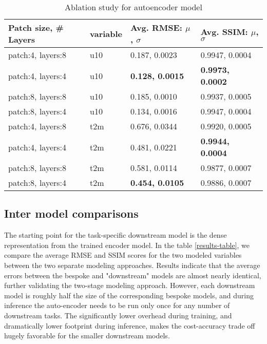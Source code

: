 \documentclass{article}
\begin{document}
\begin{table}[ht]
  \caption{Ablation study for autoencoder model} 
  \label{autoencresults-table}
  \centering
  \begin{tabular}{llll}
    \toprule
    Patch size, \# Layers    & variable & Avg. RMSE: $\mu$, $\sigma$    &  Avg. SSIM: $\mu$, $\sigma$  \\
    \midrule
    patch:4, layers:8   & u10  & 0.187, 0.0023  & 0.9947, 0.0004   \\
    patch:4, layers:4   & u10 & \textbf{0.128,  0.0015}  & \textbf{0.9973, 0.0002}     \\
    patch:8, layers:8   & u10 & 0.185, 0.0010  & 0.9937, 0.0005     \\
    patch:8, layers:4   & u10 & 0.134, 0.0016  & 0.9947, 0.0004    \\
    \midrule
    patch:4, layers:8   & t2m  & 0.676, 0.0344  & 0.9920, 0.0005   \\
    patch:4, layers:4   & t2m & 0.481, 0.0221  & \textbf{0.9944, 0.0004}    \\
    patch:8, layers:8   & t2m & 0.581, 0.0114  & 0.9877, 0.0007    \\
    patch:8, layers:4   & t2m & \textbf{0.454, 0.0105}  & 0.9886, 0.0007   \\
    \bottomrule
  \end{tabular}
\end{table}


\subsection{Inter model comparisons}

The starting point for the task-specific downstream model is the dense representation from the trained encoder model. In the table \ref{results-table}, we compare the average RMSE and SSIM scores for the two modeled variables between the two separate modeling approaches. Results indicate that the average errors between the bespoke and "downstream" models are almost nearly identical, further validating the two-stage modeling approach. However, each downstream model is roughly half the size of the corresponding bespoke models, and during inference the auto-encoder needs to be run only once for any number of downstream tasks. The significantly lower overhead during training, and dramatically lower footprint during inference, makes the cost-accuracy trade off hugely favorable for the smaller downstream models.
\end{document}
